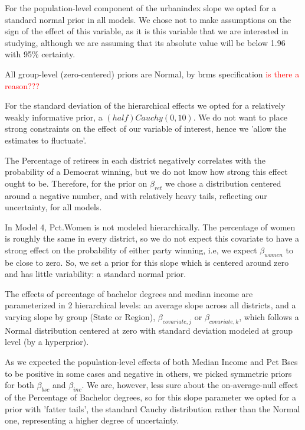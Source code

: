 \documentclass[12pt]{article}
\begin{document}
For the population-level component of the urbanindex slope we opted for a standard normal prior in all models. We chose not to make assumptions on the sign of the effect of this variable, as it is this variable that we are interested in studying, although we are assuming that its absolute value will be below 1.96 with 95\% certainty. 

All group-level (zero-centered) priors are Normal, by brms specification \textcolor{red}{is there a reason???}

For the standard deviation of the hierarchical effects we opted for a relatively weakly informative prior, a $(half)Cauchy(0,10)$.
We do not want to place strong constraints on the effect of our variable of interest, hence we 'allow the estimates to fluctuate'.



The Percentage of retirees in each district negatively correlates with the probability of a Democrat winning, but we do not know how strong this effect ought to be. Therefore, for the prior on $\beta_{ret}$ we chose a distribution centered around a negative number, and with relatively heavy tails, reflecting our uncertainty, for all models. 



In Model 4, Pct.Women is not modeled hierarchically.
The percentage of women is roughly the same in every district, so we do not expect this covariate to have a strong effect on the probability of either party winning, i.e, we expect $\beta_{women}$ to be close to zero. So, we set a prior for this slope which is centered around zero and has little variability: a standard normal prior. 



The effects of percentage of bachelor degrees and median income are parameterized in 2 hierarchical levels: an average slope across all districts, and a varying slope by group (State or Region), $\beta_{covariate,j}$ or $\beta_{covariate,k}$, which follows a Normal distribution centered at zero with standard deviation modeled at group level (by a hyperprior).

 

As we expected the population-level effects of both Median Income and Pct Bscs to be positive in some cases and negative in others, we picked symmetric priors for both $\beta_{bsc}$ and $\beta_{inc}$. We are, however, less sure about the on-average-null effect of the Percentage of Bachelor degrees, so for this slope parameter we opted for a prior with 'fatter tails', the standard Cauchy distribution rather than the Normal one, representing a higher degree of uncertainty.
\end{document}
